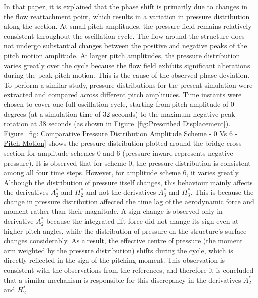 \documentclass[../main]{subfiles}
\begin{document}
In that paper, it is explained that the phase shift is primarily due to changes in the flow reattachment 
point, which results in a variation in pressure distribution along the section. At small pitch amplitudes, 
the pressure field remains relatively consistent throughout the oscillation cycle. The flow around the structure does not undergo 
substantial changes between the positive and negative peaks of the pitch motion amplitude. At larger pitch amplitudes, the pressure 
distribution varies greatly over the cycle because the flow field exhibits significant alterations during 
the peak pitch motion. This is the cause of the observed phase deviation. \\

To perform a similar study, pressure distributions for the present simulation were extracted and compared across different pitch amplitudes. Time instants were chosen 
to cover one full oscillation cycle, starting from pitch amplitude of 0 degrees (at a simulation time of 32 seconds) to the maximum negative peak rotation at 38 seconds 
(as shown in Figure~\ref{fig:Prescribed Displacement}). \\

Figure~\ref{fig: Comparative Pressure Distribution Amplitude Scheme - 0 Vs 6 - Pitch Motion} shows the pressure distribution plotted around the 
bridge cross-section for amplitude schemes 0 and 6 (pressure inward represents negative pressure). It is observed that for scheme 0, the pressure distribution 
is consistent among all four time steps. However, for amplitude scheme 6, it varies greatly. \\

Although the distribution of pressure itself changes, this behaviour mainly affects the  derivatives $A_2^*$ and $H_2^*$ 
and not the derivatives $A_3^*$ and $H_3^*$. This is because the change in pressure distribution affected the time lag 
of the aerodynamic force and moment rather than their magnitude.
A sign change is observed only in derivative $A_2^*$ because 
the integrated lift force did not change its sign  
even at higher pitch angles, while the distribution of pressure on the structure's surface changes considerably. As a result, the effective centre 
of pressure (the moment arm weighted by the pressure distribution) shifts during the cycle, which is directly 
reflected in the sign of the pitching moment. This observation is consistent with the observations from the references, and 
therefore it is concluded that a similar mechanism is responsible 
for this discrepancy in the derivatives $A_2^*$ and $H_2^*$. \\
\end{document}
